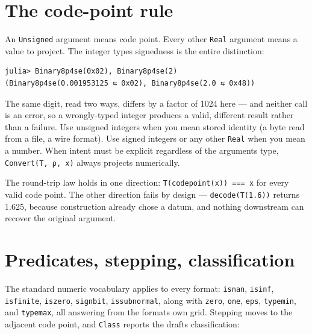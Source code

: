 \section{The code-point rule}



\label{13234262959082347228}{}


An \texttt{Unsigned} argument means code point. Every other \texttt{Real} argument means a value to project. The integer type{\textquotesingle}s signedness is the entire distinction:




\begin{verbatim}
julia> Binary8p4se(0x02), Binary8p4se(2)
(Binary8p4se(0.001953125 ⇆ 0x02), Binary8p4se(2.0 ⇆ 0x48))
\end{verbatim}



The same digit, read two ways, differs by a factor of 1024 here — and neither call is an error, so a wrongly-typed integer produces a valid, different result rather than a failure. Use unsigned integers when you mean stored identity (a byte read from a file, a wire format). Use signed integers or any other \texttt{Real} when you mean a number. When intent must be explicit regardless of the argument{\textquotesingle}s type, \texttt{Convert(T, ρ, x)} always projects numerically.



The round-trip law holds in one direction: \texttt{T(codepoint(x)) === x} for every valid code point. The other direction fails by design — \texttt{decode(T(1.6))} returns 1.625, because construction already chose a datum, and nothing downstream can recover the original argument.



\section{Predicates, stepping, classification}



\label{16759329318099337913}{}


The standard numeric vocabulary applies to every format: \texttt{isnan}, \texttt{isinf}, \texttt{isfinite}, \texttt{iszero}, \texttt{signbit}, \texttt{issubnormal}, along with \texttt{zero}, \texttt{one}, \texttt{eps}, \texttt{typemin}, and \texttt{typemax}, all answering from the format{\textquotesingle}s own grid. Stepping moves to the adjacent code point, and \texttt{Class} reports the draft{\textquotesingle}s classification:




